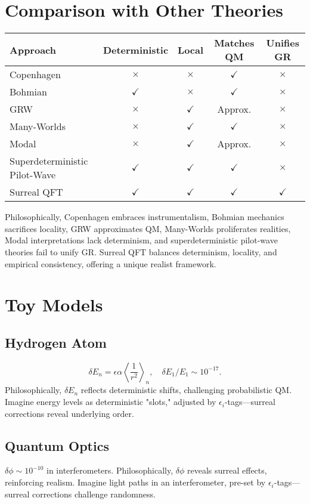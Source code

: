\documentclass{article}
\begin{document}
\section{Comparison with Other Theories}
\begin{center}
\begin{tabular}{lcccc}
\hline
\textbf{Approach} & \textbf{Deterministic} & \textbf{Local} & \textbf{Matches QM} & \textbf{Unifies GR} \\
\hline
Copenhagen & $\times$ & $\times$ & $\checkmark$ & $\times$ \\
Bohmian & $\checkmark$ & $\times$ & $\checkmark$ & $\times$ \\
GRW & $\times$ & $\checkmark$ & Approx. & $\times$ \\
Many-Worlds & $\times$ & $\checkmark$ & $\checkmark$ & $\times$ \\
Modal & $\times$ & $\checkmark$ & Approx. & $\times$ \\
Superdeterministic Pilot-Wave & $\checkmark$ & $\checkmark$ & $\checkmark$ & $\times$ \\
Surreal QFT & $\checkmark$ & $\checkmark$ & $\checkmark$ & $\checkmark$ \\
\hline
\end{tabular}
\end{center}
Philosophically, Copenhagen embraces instrumentalism, Bohmian mechanics sacrifices locality, GRW approximates QM, Many-Worlds proliferates realities, Modal interpretations lack determinism, and superdeterministic pilot-wave theories fail to unify GR. Surreal QFT balances determinism, locality, and empirical consistency, offering a unique realist framework.

\section{Toy Models}
\subsection{Hydrogen Atom}
\begin{equation}
\delta E_n = \epsilon \alpha \left\langle \frac{1}{r^2} \right\rangle_n, \quad \delta E_1 / E_1 \sim 10^{-17}.
\end{equation}
Philosophically, \(\delta E_n\) reflects deterministic shifts, challenging probabilistic QM. Imagine energy levels as deterministic "slots," adjusted by \(\epsilon_i\)-tags—surreal corrections reveal underlying order.

\subsection{Quantum Optics}
\(\delta \phi \sim 10^{-10}\) in interferometers. Philosophically, \(\delta \phi\) reveals surreal effects, reinforcing realism. Imagine light paths in an interferometer, pre-set by \(\epsilon_i\)-tags—surreal corrections challenge randomness.
\end{document}
